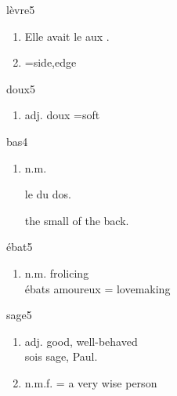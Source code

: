 \documentclass[../templates/main.tex]{subfiles}
\begin{document}
\begin{french}

	\begin{word}{lèvre}{}{5}\label{wo:lèvre}
		\begin{enumerate}[label=(\arabic*)]
			n.f.\item \begin{french}
				      Elle avait le  aux .
			      \end{french}
			\item =side,edge
		\end{enumerate}
	\end{word}
	\begin{word}{doux}{}{5}\label{wo:doux}
		\begin{enumerate}[label=(\arabic*)]
			\item \begin{french}
				      adj. doux  =soft
			      \end{french}
		\end{enumerate}
	\end{word}
	\begin{word}{bas}{}{4}\label{wo:bas}
		\begin{enumerate}[label=(\arabic*)]
			\item n.m.\begin{french}
				      le  du dos.
			      \end{french}
			      the small of the back.
		\end{enumerate}
	\end{word}
	\begin{word}{ébat}{}{5}\label{wo:ébat}
		\begin{enumerate}[label=(\arabic*)]
			\item n.m. frolicing \\
			      ébats amoureux = lovemaking
		\end{enumerate}
	\end{word}
	\begin{word}{sage}{}{5}\label{wo:sage}
		\begin{enumerate}[label=(\arabic*)]
			\item adj. good, well-behaved \\
			      sois sage, Paul.
			\item n.m.f. = a very wise person\\

\end{enumerate}
\end{word}
\end{french}
\end{document}
